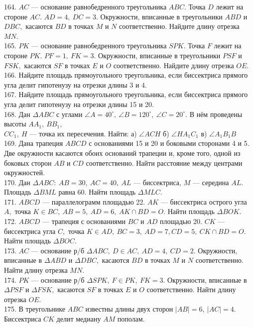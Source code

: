 \documentclass[12pt]{article}
\begin{document}
164. $AC$ --- основание равнобедренного треугольника $ABC.$ Точка $D$ лежит на стороне $AC.$ $AD=4,\ DC=3.$ Окружности, вписанные в треугольники $ABD$ и $DBC,$ касаются $BD$ в точках $M$ и $N$ соответственно. Найдите длину отрезка $MN.$\\
165. $PK$ --- основание равнобедренного треугольника $SPK.$ Точка $F$ лежит на стороне $PK.$ $PF=1,\ FK=3.$ Окружности, вписанные в треугольники $PSF$ и $FSK,$ касаются $SF$ в точках $E$ и $O$ соответственно. Найдите длину отрезка $OE.$\\
166. Найдите площадь прямоугольного треугольника, если биссектриса прямого угла делит гипотенузу на отрезки длины 3 и 4.\\
167. Найдите площадь прямоугольного треугольника, если биссектриса прямого угла делит гипотенузу на отрезки длины 15 и 20.\\
168. Дан $\Delta ABC$ с углами $\angle A=40^\circ,\ \angle B=120^\circ,\ \angle C=20^\circ.$ В нём проведены высоты $AA_1,\ BB_1,$\\$ CC_1,\ H$ --- точка их пересечения. Найти: а) $\angle ACH$ б) $\angle HA_1C_1$ в) $\angle A_1B_1B$\\
169. Дана трапеция $ABCD$ с основаниями 15 и 20 и боковыми сторонами 4 и 5. Две окружности касаются обоих оснований трапеции и, кроме того, одной из боковых сторон $AB$ и $CD$ соответственно. Найти расстояние между центрами окружностей.\\
170. Дан $\Delta ABC:\ AB=30,\ AC=40,\ AL$ --- биссектриса, $M$ --- середина $AL.$ Площадь $\Delta BML$ равна 60. Найти площадь $\Delta MLC.$\\
171. $ABCD$ --- параллелограмм площадью 22. $AK$ --- биссектриса острого угла $A,$ точка $K\in BC,\ AB=5,\ AD=6,\ AK\cap BD=O.$ Найти площадь $\Delta BOK.$\\
172. $ABCD$ --- трапеция с основаниями $BC$ и $AD$ площадью 20. $CK$ --- биссектриса угла $C,$ точка $K\in AD,\ BC=3,\ AD=7, CD=5,\ CK\cap BD=O.$ Найти площадь $\Delta BOC.$\\
173. $AC$ --- основание р/б $\Delta ABC,\ D\in AC,\ AD=4,\ CD=2.$ Окружности, вписанные в $\Delta ABD$ и $\Delta DBC,$ касаются $BD$ в точках $M$ и $N$ соответственно. Найти длину отрезка $MN.$\\
174. $PK$ --- основание р/б $\Delta SPK,\ F\in PK,\ FK=3.$ Окружности, вписанные в $\Delta PSF$ и $\Delta FSK,$ касаются $SF$ в точках $E$ и $O$ соответственно. Найти длину отрезка $OE.$\\
175. В треугольнике $ABC$ известны длины двух сторон $|AB|=6,\ |AC|=4.$ Биссектриса $CK$ делит медиану $AM$ пополам.\\
\end{document}
